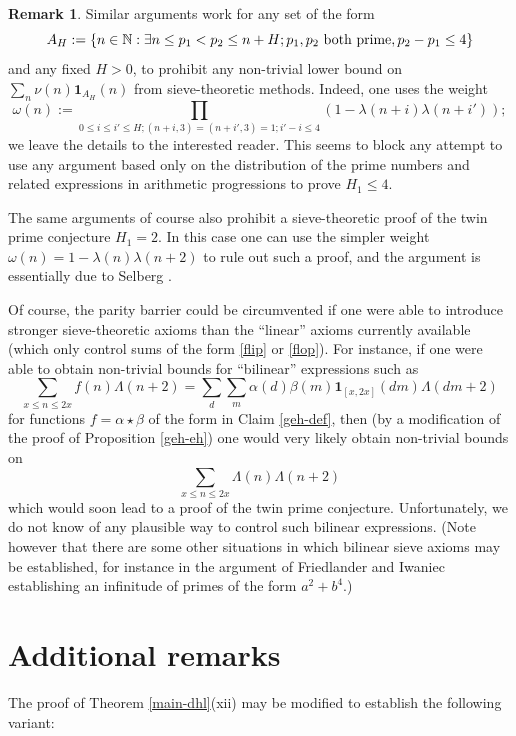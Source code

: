 \documentclass{bmcart}
\theoremstyle{plain}
\theoremstyle{definition}
\newtheorem{remark}[theorem]{Remark}
\newcommand\N{\mathbb{N}}
\newcommand{\onef}{\mathbf{1}}
\begin{document}
\begin{remark}  Similar arguments work for any set of the form
$$ A_H := \{ n \in \N: \exists n \leq p_1 < p_2 \leq n+H; p_1,p_2 \hbox{ both prime}, p_2 - p_1 \leq 4 \}$$
and any fixed $H > 0$, to prohibit any non-trivial lower bound on $\sum_n \nu(n) \onef_{A_H}(n)$ from sieve-theoretic methods. Indeed, one uses the weight
$$ \omega(n) := \prod_{0 \leq i \leq i' \leq H; (n+i,3) = (n+i',3) = 1; i'-i \leq 4} (1 - \lambda(n+i) \lambda(n+i'));$$
we leave the details to the interested reader.  This seems to block any attempt to use any argument based only on the distribution of the prime numbers and related expressions in arithmetic progressions to prove $H_1 \leq 4$.
\end{remark}

The same arguments of course also prohibit a sieve-theoretic proof of the twin prime conjecture $H_1 = 2$.   In this case one can use the simpler weight $\omega(n) = 1 - \lambda(n) \lambda(n+2)$ to rule out such a proof, and the argument is essentially due to Selberg \cite{selberg}.

Of course, the parity barrier could be circumvented if one were able to introduce stronger sieve-theoretic axioms than the ``linear'' axioms currently available (which only control sums of the form \eqref{flip} or \eqref{flop}).  For instance, if one were able to obtain non-trivial bounds for ``bilinear'' expressions such as
$$ \sum_{x \leq n \leq 2x} f(n) \Lambda(n+2) = \sum_d \sum_m \alpha(d) \beta(m) \onef_{[x,2x]}(dm) \Lambda(dm+2)$$
for functions $f = \alpha \star \beta$ of the form in Claim \ref{geh-def}, then (by a modification of the proof of Proposition \ref{geh-eh}) one would very likely obtain non-trivial bounds on
$$ \sum_{x \leq n \leq 2x} \Lambda(n) \Lambda(n+2)$$
which would soon lead to a proof of the twin prime conjecture.  Unfortunately, we do not know of any plausible way to control such bilinear expressions.  (Note however that there are some other situations in which bilinear sieve axioms may be established, for instance in the argument of Friedlander and Iwaniec \cite{fi} establishing an infinitude of primes of the form $a^2+b^4$.)

\section{Additional remarks}\label{remarks-sec}

The proof of Theorem \ref{main-dhl}(xii) may be modified to establish the following variant:
\end{document}

